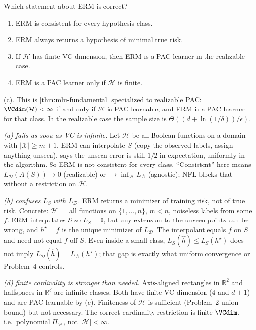 \begin{exercise}
\label{ex:mlu-erm-vc-mcq}
Which statement about ERM is correct?
\begin{enumerate}[label=(\alph*)]
    \item ERM is consistent for every hypothesis class.
    \item ERM always returns a hypothesis of minimal true risk.
    \item If $\mathcal{H}$ has finite VC dimension, then ERM is a PAC learner in the realizable case.
    \item ERM is a PAC learner only if $\mathcal{H}$ is finite.
\end{enumerate}
\end{exercise}

\begin{solution}
(c). This is \cref{thm:mlu-fundamental} specialized to realizable PAC: $\VCdim(\mathcal{H})<\infty$ if and only if $\mathcal{H}$ is PAC learnable, and ERM is a PAC learner for that class. In the realizable case the sample size is $\Theta((d+\ln(1/\delta))/\epsilon)$.

\textit{(a) fails as soon as VC is infinite.}
Let $\mathcal{H}$ be all Boolean functions on a domain with $\lvert\mathcal{X}\rvert\ge m+1$. ERM can interpolate $S$ (copy the observed labels, assign anything unseen).  says the unseen error is still $1/2$ in expectation, uniformly in the algorithm. So ERM is not consistent for every class. ``Consistent'' here means $L_{\mathcal{D}}(A(S))\to 0$ (realizable) or $\to\inf_{\mathcal{H}}L_{\mathcal{D}}$ (agnostic); NFL blocks that without a restriction on $\mathcal{H}$.

\textit{(b) confuses $L_S$ with $L_{\mathcal{D}}$.}
ERM returns a minimizer of training risk, not of true risk. Concrete: $\mathcal{H}=$ all functions on $\{1,\dots,n\}$, $m<n$, noiseless labels from some $f$. ERM interpolates $S$ so $L_S=0$, but any extension to the unseen points can be wrong, and $h^\star=f$ is the unique minimizer of $L_{\mathcal{D}}$. The interpolant equals $f$ on $S$ and need not equal $f$ off $S$. Even inside a small class, $L_S(\widehat h)\le L_S(h^\star)$ does not imply $L_{\mathcal{D}}(\widehat h)=L_{\mathcal{D}}(h^\star)$; that gap is exactly what uniform convergence or Problem~4 controls.

\textit{(d) finite cardinality is stronger than needed.}
Axis-aligned rectangles in $\mathbb{R}^2$ and halfspaces in $\mathbb{R}^d$ are infinite classes. Both have finite VC dimension ($4$ and $d+1$) and are PAC learnable by (c). Finiteness of $\mathcal{H}$ is sufficient (Problem~2 union bound) but not necessary. The correct cardinality restriction is finite $\VCdim$, i.e.\ polynomial $\Pi_{\mathcal{H}}$, not $\lvert\mathcal{H}\rvert<\infty$.
\end{solution}

